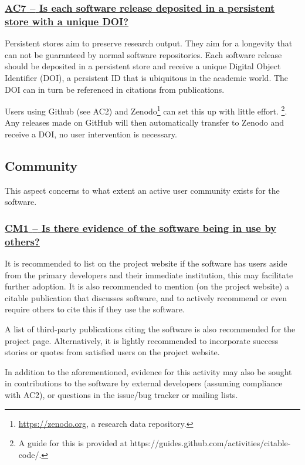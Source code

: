 \documentclass[a4paper,11pt]{article}
\newcommand{\criterion}[1]{\subsubsection*{\underline{#1}}}
\begin{document}
\newcommand{\acSevenID}{AC7}
\newcommand{\acSevenText}{Is each software release deposited in a persistent store with a unique DOI?}
\criterion{\acSevenID{ }--{ }\acSevenText}\label{id:ac7} 

Persistent stores aim to preserve research output. They aim for a longevity
that can not be guaranteed by normal software repositories. Each software
release should be deposited in a persistent store and receive a unique Digital
Object Identifier (DOI),  a persistent ID that is ubiquitous in the academic
world. The DOI can in turn be referenced in citations from publications.

Users using Github (see AC2) and Zenodo\footnote{\url{https://zenodo.org}, a
research data repository.} can set this up with little effort. \footnote{A guide
for this is provided at https://guides.github.com/activities/citable-code/.}.
Any releases made on GitHub will then automatically transfer to Zenodo and
receive a DOI, no user intervention is necessary. 

\subsection{Community}\label{sec:com}

This aspect concerns to what extent an active user community exists for the
software.

\newcommand{\cmOneID}{CM1}
\newcommand{\cmOneText}{Is there evidence of the software being in use by others?}
\criterion{\cmOneID{ }--{ }\cmOneText}\label{id:cm1} 

It is recommended to list on the project website if the software has 
users aside from the primary developers and their immediate institution, this
may facilitate further adoption. It is also recommended to mention (on the
project website) a citable publication that discusses software, and to actively
recommend or even require others to cite this if they use the software.

A list of third-party publications citing the software is also recommended for
the project page. Alternatively, it is lightly recommended to
incorporate success stories or quotes from satisfied users on the project
website.

In addition to the aforementioned, evidence for this activity may also be sought
in contributions to the software by external developers (assuming
compliance with AC2), or questions in the issue/bug tracker or mailing lists.
\end{document}
